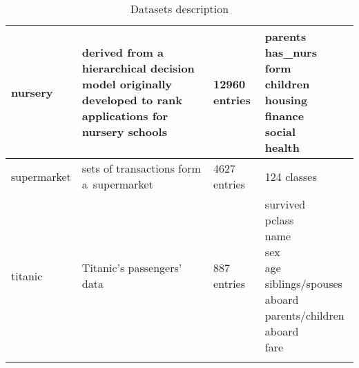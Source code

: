 \documentclass{article}
\begin{document}
\begin{longtable}{ p{} | p{}| p{}| p{} }
		\hline
		nursery& derived from a hierarchical decision model originally developed to rank applications for nursery schools & 12960 entries&\makecell{parents\\has\_nurs\\form\\children\\housing\\finance\\social\\health}\\
		\hline
		supermarket& sets of transactions form a~supermarket & 4627 entries&124 classes\\
		\hline
		titanic& Titanic's passengers' data  & 887 entries&\makecell{survived\\pclass\\name\\sex\\age\\siblings/spouses aboard\\parents/children aboard\\fare}\\
		\hline
		\caption{Datasets description}
	\end{longtable} 
	\label{res_enh}
\end{document}
